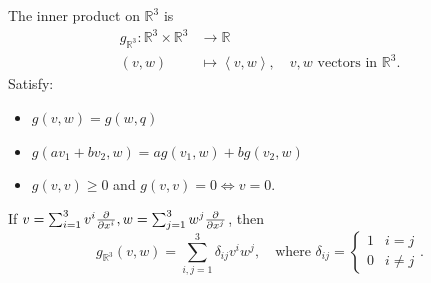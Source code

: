 The inner product on \(\mathbb{R}^3\) is
\begin{align*}
    g_{\mathbb{R}^3}\colon\mathbb{R}^3\times\mathbb{R}^3&\longrightarrow\mathbb{R}\\
    (v,w) &\longmapsto \left<v,w\right>,
    \quad v,w \text{ vectors in }\mathbb{R}^3
.\end{align*}
Satisfy:
\begin{itemize}
    \item \(g(v,w)=g(w,q)\)
    \item \(g(av_1+bv_2,w)=ag(v_1,w)+bg(v_2,w)\)
    \item \(g(v,v)\ge 0\) and \(g(v,v)=0\iff v=0\).
\end{itemize}
If \(v=\sum_{i=1}^3 v^i\pdv{x^i},w=\sum_{j=1}^{3}w^j\pdv{x^j}\), then \[
    g_{\mathbb{R}^3}(v,w)=\sum_{i,j=1}^{3}\delta_{ij}v^i w^j,
    \quad \text{where }\delta_{ij}=\begin{cases}
        1 & i=j\\
        0 & i\neq j
    \end{cases}
.\] 

